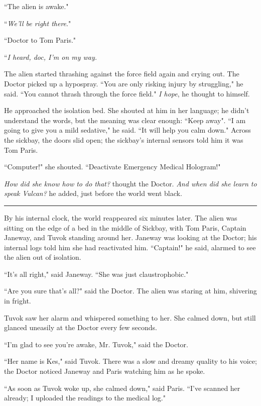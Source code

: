 \documentclass[twoside,letterpaper,12pt]{memoir}
\begin{document}
``The alien is awake." 

``\textit{We'll be right there}." 

``Doctor to Tom Paris." 

``\textit{I heard, doc, I'm on my way.} 

The alien started thrashing against the force field again and crying out. The Doctor picked up a hypospray. ``You are only risking injury by struggling," he said. ``You cannot thrash through the force field." \textit{I hope}, he thought to himself. 

He approached the isolation bed. She shouted at him in her language; he didn't understand the words, but the meaning was clear enough: ``Keep away". ``I am going to give you a mild sedative," he said. ``It will help you calm down." Across the sickbay, the doors slid open; the sickbay's internal sensors told him it was Tom Paris. 

``Computer!" she shouted. ``Deactivate Emergency Medical Hologram!" 

\textit{How did she know how to do that?} thought the Doctor. \textit{And when did she learn to speak Vulcan?} he added, just before the world went black. 

\begin{center}\rule{3cm}{0.4 pt}\end{center} 

By his internal clock, the world reappeared six minutes later. The alien was sitting on the edge of a bed in the middle of Sickbay, with Tom Paris, Captain Janeway, and Tuvok standing around her. Janeway was looking at the Doctor; his internal logs told him she had reactivated him. ``Captain!" he said, alarmed to see the alien out of isolation. 

``It's all right," said Janeway. ``She was just claustrophobic." 

``Are you sure that's all?" said the Doctor. The alien was staring at him, shivering in fright. 

Tuvok saw her alarm and whispered something to her. She calmed down, but still glanced uneasily at the Doctor every few seconds. 

``I'm glad to see you're awake, Mr. Tuvok," said the Doctor. 

``Her name is Kes," said Tuvok. There was a slow and dreamy quality to his voice; the Doctor noticed Janeway and Paris watching him as he spoke. 

``As soon as Tuvok woke up, she calmed down," said Paris. ``I've scanned her already; I uploaded the readings to the medical log." 
\end{document}
